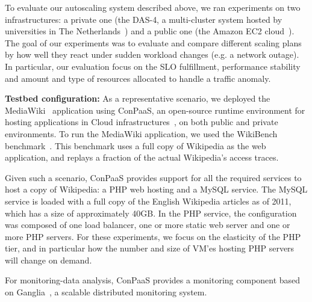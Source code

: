 \label{sec:experiments}

To evaluate our autoscaling system described above, we ran experiments
on two infrastructures: a private one (the DAS-4, a multi-cluster system
hosted by universities in The Netherlands~\cite{das4}) and a public
one (the Amazon EC2 cloud~\cite{amazonEC2}). The goal of our experiments
was to evaluate and compare different scaling plans by how well they react under sudden
workload changes (e.g. a network outage). In particular, our evaluation focus on
the SLO fulfillment, performance stability and amount and type of resources allocated to handle
a traffic anomaly. 



\textbf{Testbed configuration:}  As a representative scenario, we deployed the MediaWiki~\cite{mediawiki} application using ConPaaS, an open-source runtime environment for hosting applications in Cloud infrastructures~\cite{conpaasIC}, on both public and private environments. To run the MediaWiki application, we used the WikiBench benchmark~\cite{wikibench}. This benchmark uses a full copy of Wikipedia as the web application, and replays a fraction of the actual Wikipedia's access traces. 

Given such a scenario, ConPaaS provides support for all the required services to host a copy of Wikipedia: a PHP web hosting and a MySQL service. The MySQL service is loaded with a full copy of the English Wikipedia articles as of 2011, which has a size of approximately 40GB.  In the PHP service, the configuration was composed of one load balancer, one or more static web server and one or more PHP servers. For these experiments, we focus on the elasticity of the PHP tier, and in particular how the number and size of VM'es hosting PHP servers will change on demand.

For monitoring-data analysis, ConPaaS provides a monitoring component based on Ganglia~\cite{ganglia}, a scalable distributed monitoring system. 


